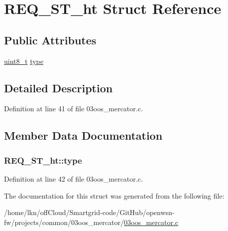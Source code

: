 \hypertarget{struct_r_e_q___s_t__ht}{}\section{R\+E\+Q\+\_\+\+S\+T\+\_\+ht Struct Reference}
\label{struct_r_e_q___s_t__ht}
\subsection*{Public Attributes}
\begin{DoxyCompactItemize}
\item 
\hyperlink{_p_e___types_8h_aba7bc1797add20fe3efdf37ced1182c5}{uint8\+\_\+t} \hyperlink{struct_r_e_q___s_t__ht_a576a9345e040745e0e99f69080a5e7cc}{type}
\end{DoxyCompactItemize}


\subsection{Detailed Description}


Definition at line 41 of file 03oos\+\_\+mercator.\+c.



\subsection{Member Data Documentation}
\subsubsection[{\texorpdfstring{type}{type}}]{ R\+E\+Q\+\_\+\+S\+T\+\_\+ht\+::type}\hypertarget{struct_r_e_q___s_t__ht_a576a9345e040745e0e99f69080a5e7cc}{}\label{struct_r_e_q___s_t__ht_a576a9345e040745e0e99f69080a5e7cc}


Definition at line 42 of file 03oos\+\_\+mercator.\+c.



The documentation for this struct was generated from the following file\+:\begin{DoxyCompactItemize}
\item 
/home/lkn/off\+Cloud/\+Smartgrid-\/code/\+Git\+Hub/openwsn-\/fw/projects/common/03oos\+\_\+mercator/\hyperlink{03oos__mercator_8c}{03oos\+\_\+mercator.\+c}\end{DoxyCompactItemize}
